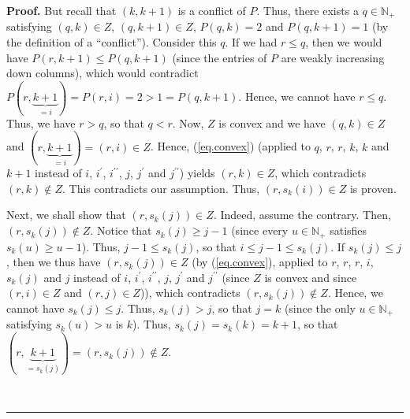 \documentclass[numbers=enddot,12pt,final,onecolumn,notitlepage]{scrartcl}%
\theoremstyle{definition}
\newenvironment{proof}[1][Proof]{\noindent\textbf{#1.} }{\ \rule{0.5em}{0.5em}}
\newenvironment{noncompile}{}{}
\begin{document}
\begin{noncompile}
\begin{proof}
But recall that $\left(  k,k+1\right)  $ is a conflict of $P$. Thus, there
exists a $q\in\mathbb{N}_{+}$ satisfying $\left(  q,k\right)  \in Z$, $\left(
q,k+1\right)  \in Z$, $P\left(  q,k\right)  =2$ and $P\left(  q,k+1\right)
=1$ (by the definition of a \textquotedblleft conflict\textquotedblright).
Consider this $q$. If we had $r\leq q$, then we would have $P\left(
r,k+1\right)  \leq P\left(  q,k+1\right)  $ (since the entries of $P$ are
weakly increasing down columns), which would contradict $P\left(
r,\underbrace{k+1}_{=i}\right)  =P\left(  r,i\right)  =2>1=P\left(
q,k+1\right)  $. Hence, we cannot have $r\leq q$. Thus, we have $r>q$, so that
$q<r$. Now, $Z$ is convex and we have $\left(  q,k\right)  \in Z$ and $\left(
r,\underbrace{k+1}_{=i}\right)  =\left(  r,i\right)  \in Z$. Hence,
(\ref{eq.convex}) (applied to $q$, $r$, $r$, $k$, $k$ and $k+1$ instead of
$i$, $i^{\prime}$, $i^{\prime\prime}$, $j$, $j^{\prime}$ and $j^{\prime\prime
}$) yields $\left(  r,k\right)  \in Z$, which contradicts $\left(  r,k\right)
\notin Z$. This contradicts our assumption. Thus, $\left(  r,s_{k}\left(
i\right)  \right)  \in Z$ is proven.

Next, we shall show that $\left(  r,s_{k}\left(  j\right)  \right)  \in Z$.
Indeed, assume the contrary. Then, $\left(  r,s_{k}\left(  j\right)  \right)
\notin Z$. Notice that $s_{k}\left(  j\right)  \geq j-1$ (since every
$u\in\mathbb{N}_{+}$ satisfies $s_{k}\left(  u\right)  \geq u-1$). Thus,
$j-1\leq s_{k}\left(  j\right)  $, so that $i\leq j-1\leq s_{k}\left(
j\right)  $. If $s_{k}\left(  j\right)  \leq j$, then we thus have $\left(
r,s_{k}\left(  j\right)  \right)  \in Z$ (by (\ref{eq.convex}), applied to
$r$, $r$, $r$, $i$, $s_{k}\left(  j\right)  $ and $j$ instead of $i$,
$i^{\prime}$, $i^{\prime\prime}$, $j$, $j^{\prime}$ and $j^{\prime\prime}$
(since $Z$ is convex and since $\left(  r,i\right)  \in Z$ and $\left(
r,j\right)  \in Z$)), which contradicts $\left(  r,s_{k}\left(  j\right)
\right)  \notin Z$. Hence, we cannot have $s_{k}\left(  j\right)  \leq j$.
Thus, $s_{k}\left(  j\right)  >j$, so that $j=k$ (since the only
$u\in\mathbb{N}_{+}$ satisfying $s_{k}\left(  u\right)  >u$ is $k$). Thus,
$s_{k}\left(  j\right)  =s_{k}\left(  k\right)  =k+1$, so that $\left(
r,\underbrace{k+1}_{=s_{k}\left(  j\right)  }\right)  =\left(  r,s_{k}\left(
j\right)  \right)  \notin Z$.


\end{proof}
\end{noncompile}
\end{document}
